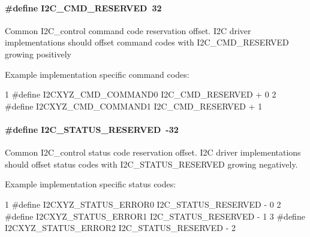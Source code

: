 \paragraph[{I2\+C\+\_\+\+C\+M\+D\+\_\+\+R\+E\+S\+E\+R\+V\+E\+D}]{\setlength{\rightskip}{0pt plus 5cm}\#define I2\+C\+\_\+\+C\+M\+D\+\_\+\+R\+E\+S\+E\+R\+V\+E\+D~32}\label{group___i2_c___c_o_n_t_r_o_l_ga760ec0a6fdb876ccc67b6f06301d53ec}
Common I2\+C\+\_\+control command code reservation offset. I2\+C driver implementations should offset command codes with I2\+C\+\_\+\+C\+M\+D\+\_\+\+R\+E\+S\+E\+R\+V\+E\+D growing positively

Example implementation specific command codes\+: 
\begin{DoxyCode}
1 #define I2CXYZ\_CMD\_COMMAND0      I2C\_CMD\_RESERVED + 0
2 #define I2CXYZ\_CMD\_COMMAND1      I2C\_CMD\_RESERVED + 1
\end{DoxyCode}
\paragraph[{I2\+C\+\_\+\+S\+T\+A\+T\+U\+S\+\_\+\+R\+E\+S\+E\+R\+V\+E\+D}]{\setlength{\rightskip}{0pt plus 5cm}\#define I2\+C\+\_\+\+S\+T\+A\+T\+U\+S\+\_\+\+R\+E\+S\+E\+R\+V\+E\+D~-\/32}\label{group___i2_c___c_o_n_t_r_o_l_gacfd04572fe349d087c2547501cbc7e0a}
Common I2\+C\+\_\+control status code reservation offset. I2\+C driver implementations should offset status codes with I2\+C\+\_\+\+S\+T\+A\+T\+U\+S\+\_\+\+R\+E\+S\+E\+R\+V\+E\+D growing negatively.

Example implementation specific status codes\+: 
\begin{DoxyCode}
1 #define I2CXYZ\_STATUS\_ERROR0     I2C\_STATUS\_RESERVED - 0
2 #define I2CXYZ\_STATUS\_ERROR1     I2C\_STATUS\_RESERVED - 1
3 #define I2CXYZ\_STATUS\_ERROR2     I2C\_STATUS\_RESERVED - 2
\end{DoxyCode}
 